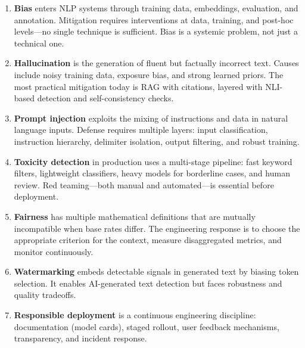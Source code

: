\begin{enumerate}
    \item \textbf{Bias} enters NLP systems through training data, embeddings,
          evaluation, and annotation.  Mitigation requires interventions at
          data, training, and post-hoc levels---no single technique is
          sufficient.  Bias is a systemic problem, not just a technical one.

    \item \textbf{Hallucination} is the generation of fluent but factually
          incorrect text.  Causes include noisy training data, exposure bias,
          and strong learned priors.  The most practical mitigation today is
          RAG with citations, layered with NLI-based detection and
          self-consistency checks.

    \item \textbf{Prompt injection} exploits the mixing of instructions and
          data in natural language inputs.  Defense requires multiple layers:
          input classification, instruction hierarchy, delimiter isolation,
          output filtering, and robust training.

    \item \textbf{Toxicity detection} in production uses a multi-stage
          pipeline: fast keyword filters, lightweight classifiers, heavy
          models for borderline cases, and human review.  Red teaming---both
          manual and automated---is essential before deployment.

    \item \textbf{Fairness} has multiple mathematical definitions that are
          mutually incompatible when base rates differ.  The engineering
          response is to choose the appropriate criterion for the context,
          measure disaggregated metrics, and monitor continuously.

    \item \textbf{Watermarking} embeds detectable signals in generated text
          by biasing token selection.  It enables AI-generated text detection
          but faces robustness and quality tradeoffs.

    \item \textbf{Responsible deployment} is a continuous engineering
          discipline: documentation (model cards), staged rollout, user
          feedback mechanisms, transparency, and incident response.
\end{enumerate}

